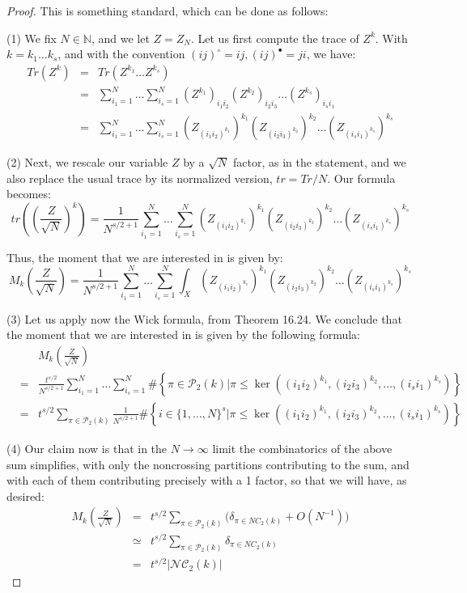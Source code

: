 \documentclass[12pt]{amsbook}
\begin{document}
\begin{proof}
This is something standard, which can be done as follows:

\medskip

(1) We fix $N\in\mathbb N$, and we let $Z=Z_N$. Let us first compute the trace of $Z^k$. With $k=k_1\ldots k_s$, and with the convention $(ij)^\circ=ij,(ij)^\bullet=ji$, we have:
\begin{eqnarray*}
Tr(Z^k)
&=&Tr(Z^{k_1}\ldots Z^{k_s})\\
&=&\sum_{i_1=1}^N\ldots\sum_{i_s=1}^N(Z^{k_1})_{i_1i_2}(Z^{k_2})_{i_2i_3}\ldots(Z^{k_s})_{i_si_1}\\
&=&\sum_{i_1=1}^N\ldots\sum_{i_s=1}^N(Z_{(i_1i_2)^{k_1}})^{k_1}(Z_{(i_2i_3)^{k_2}})^{k_2}\ldots(Z_{(i_si_1)^{k_s}})^{k_s}
\end{eqnarray*}

(2) Next, we rescale our variable $Z$ by a $\sqrt{N}$ factor, as in the statement, and we also replace the usual trace by its normalized version, $tr=Tr/N$. Our formula becomes:
$$tr\left(\left(\frac{Z}{\sqrt{N}}\right)^k\right)=\frac{1}{N^{s/2+1}}\sum_{i_1=1}^N\ldots\sum_{i_s=1}^N(Z_{(i_1i_2)^{k_1}})^{k_1}(Z_{(i_2i_3)^{k_2}})^{k_2}\ldots(Z_{(i_si_1)^{k_s}})^{k_s}$$

Thus, the moment that we are interested in is given by:
$$M_k\left(\frac{Z}{\sqrt{N}}\right)=\frac{1}{N^{s/2+1}}\sum_{i_1=1}^N\ldots\sum_{i_s=1}^N\int_X(Z_{(i_1i_2)^{k_1}})^{k_1}(Z_{(i_2i_3)^{k_2}})^{k_2}\ldots(Z_{(i_si_1)^{k_s}})^{k_s}$$

(3) Let us apply now the Wick formula, from Theorem 16.24. We conclude that the moment that we are interested in is given by the following formula:
\begin{eqnarray*}
&&M_k\left(\frac{Z}{\sqrt{N}}\right)\\
&=&\frac{t^{s/2}}{N^{s/2+1}}\sum_{i_1=1}^N\ldots\sum_{i_s=1}^N\#\left\{\pi\in\mathcal P_2(k)\Big|\pi\leq\ker\left((i_1i_2)^{k_1},(i_2i_3)^{k_2},\ldots,(i_si_1)^{k_s}\right)\right\}\\
&=&t^{s/2}\sum_{\pi\in\mathcal P_2(k)}\frac{1}{N^{s/2+1}}\#\left\{i\in\{1,\ldots,N\}^s\Big|\pi\leq\ker\left((i_1i_2)^{k_1},(i_2i_3)^{k_2},\ldots,(i_si_1)^{k_s}\right)\right\}
\end{eqnarray*}

(4) Our claim now is that in the $N\to\infty$ limit the combinatorics of the above sum simplifies, with only the noncrossing partitions contributing to the sum, and with each of them contributing precisely with a 1 factor, so that we will have, as desired:
\begin{eqnarray*}
M_k\left(\frac{Z}{\sqrt{N}}\right)
&=&t^{s/2}\sum_{\pi\in\mathcal P_2(k)}\Big(\delta_{\pi\in NC_2(k)}+O(N^{-1})\Big)\\
&\simeq&t^{s/2}\sum_{\pi\in\mathcal P_2(k)}\delta_{\pi\in NC_2(k)}\\
&=&t^{s/2}|\mathcal{NC}_2(k)|
\end{eqnarray*}


\end{proof}
\end{document}
